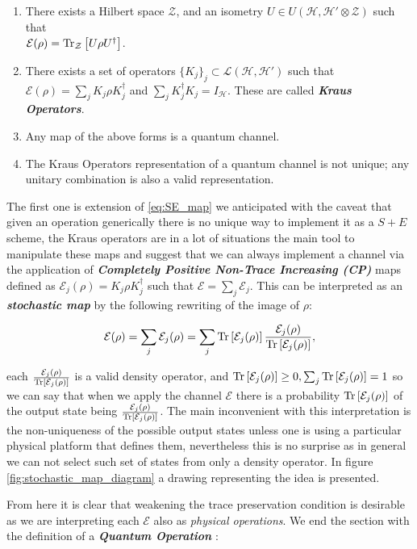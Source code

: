 \begin{enumerate}
  \item There exists a Hilbert space $\mathcal{Z}$,  and an isometry $U \in U(\mathcal{H}, \mathcal{H}'\otimes \mathcal{Z})$ such that\\ $\mathcal{E}(\rho) = \mathrm{Tr}_{\mathcal{Z}}\left[U\rho U^{\dagger}\right]$.
  \item There exists a set of operators $\{K_{j} \}_{j} \subset \mathcal{L}(\mathcal{H}, \mathcal{H}')$ such that $\mathcal{E}(\rho) = \sum_{j}K_{j}\rho K_{j}^{\dagger}$ and $\sum_{j}K_{j}^{\dagger}K_{j}=I_{\mathcal{H}}$. These are called \textit{\textbf{Kraus Operators}}.
  \item Any map of the above forms is a quantum channel.
  \item The Kraus Operators representation of a quantum channel is not unique; any unitary combination is also a valid representation.
\end{enumerate}
The first one is extension of \eqref{eq:SE_map} we anticipated with the caveat that given an operation generically there is no unique way to implement it as
a $S+E$ scheme, the Kraus operators are in a lot of situations the main tool to manipulate these maps and suggest that we can
always implement a channel via the application of \textbf{\textit{Completely Positive Non-Trace Increasing (CP)}} maps  defined as $\mathcal{E}_{j}(\rho)=K_{j}\rho K_{j}^{\dagger}$ such that $\mathcal{E} = \sum_{j}\mathcal{E}_{j}$. This can be interpreted as an \textbf{\textit{stochastic map}} \cite{nielsen_quantum_2010} by the following
rewriting of the image of $\rho$:

\begin{equation}
  \mathcal{E}(\rho) = \sum_{j}\mathcal{E}_{j}(\rho) = \sum_{j}\mathrm{Tr}\left[\mathcal{E}_{j}(\rho)\right]\frac{\mathcal{E}_{j}(\rho)}{\mathrm{Tr}\left[\mathcal{E}_{j}(\rho)\right]},
\end{equation}

each $\frac{\mathcal{E}_{j}(\rho)}{\mathrm{Tr}\left[\mathcal{E}_{j}(\rho)\right]}$ is a valid density operator, and $\mathrm{Tr}\left[\mathcal{E}_{j}(\rho)\right]\geq 0,
\sum_{j}\mathrm{Tr}\left[\mathcal{E}_{j}(\rho)\right]=1$ so we can say that when we apply the channel $\mathcal{E}$ there is a probability
$\mathrm{Tr}\left[\mathcal{E}_{j}(\rho)\right]$ of the output state being $\frac{\mathcal{E}_{j}(\rho)}{\mathrm{Tr}\left[\mathcal{E}_{j}(\rho)\right]}$. The main inconvenient
with this interpretation is the non-uniqueness of the possible output states unless one is using a particular physical platform that
defines them, nevertheless this is no surprise as in general we can not select such set of states from only a density operator. In figure
\ref{fig:stochastic_map_diagram} a drawing representing the idea is presented.

From here it is clear that weakening the trace preservation condition is desirable as we are interpreting each $\mathcal{E}$ also as
\textit{physical operations}. We end the section with the definition of a \textbf{\textit{Quantum Operation}} \cite{strasberg2022quantum,nielsen_quantum_2010,wiseman_quantum_2010}:

